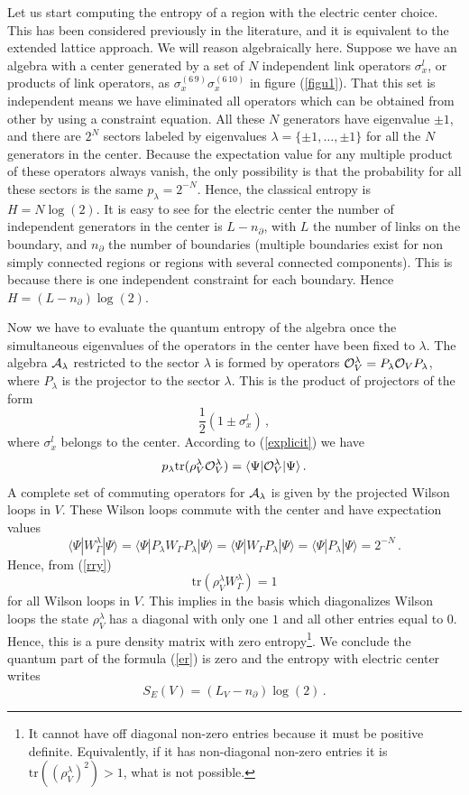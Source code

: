 \documentclass[12pt,a4paper]{article}
\newcommand{\be}{\begin{equation}}
\newcommand{\ee}{\end{equation}}
\def\be{\begin{equation}}
\def\ee{\end{equation}}
\begin{document}
Let us start computing the entropy of a region with the electric center choice. This has been considered previously in the literature, 
and it is equivalent to the extended lattice approach. We will reason algebraically here.  Suppose we have an algebra with a center 
generated by a set of $N$ independent link operators $\sigma_x^l$, or products of link operators, as $\sigma_x^{(6\, 9)} \sigma_x^{(6\, 10)}$ in 
figure (\ref{figu1}). That this set is independent means we have eliminated all operators which can be obtained from other by using a 
constraint equation. All these $N$ generators have eigenvalue $\pm 1$, and there are $2^N$ sectors labeled by 
eigenvalues $\lambda=\{\pm 1,\hdots,\pm 1\}$ for all the $N$ generators in the center. Because the expectation value for any 
multiple product of these operators always vanish, the only possibility is that the probability for all these sectors is the same $p_\lambda=2^{-N}$. 
Hence, the classical entropy is $H=N \log(2)$. It is easy to see for the electric center the number of independent generators in the 
center is $L-n_\partial$, with $L$ the number of links on the boundary, and $n_\partial$ the number of boundaries (multiple boundaries 
exist for non simply connected regions or regions with several connected components). This is because there is one independent constraint 
for each boundary. Hence $H=(L-n_\partial)\log(2)$.     

Now we have to evaluate the quantum entropy of the algebra once the simultaneous eigenvalues of the operators in the center have been 
fixed to $\lambda$. The algebra ${\cal A}_\lambda$ restricted to the sector $\lambda$ is formed by 
operators ${\cal O}_V^\lambda=P_\lambda {\cal O}_V P_\lambda$, where $P_\lambda$ is the projector to the sector $\lambda$. 
This is the product of projectors of the form
\be
\frac{1}{2}(1\pm \sigma_x^l)\,,
\ee  
where $\sigma_x^l$ belongs to the center.  
According to (\ref{explicit}) we have
\be
p_\lambda \textrm{tr}(\rho_V^\lambda {\cal O}_V^\lambda)=\langle \Psi|{\cal O}_V^\lambda|\Psi \rangle\,.\label{rry}
\ee
A complete set of commuting operators for ${\cal A}_\lambda$ is given by the projected Wilson loops in $V$. These Wilson loops 
commute with the center and have expectation values
\be
\langle \Psi|W_\Gamma^\lambda|\Psi \rangle=\langle \Psi|P_\lambda W_\Gamma P_\lambda|\Psi \rangle=\langle \Psi| W_\Gamma P_\lambda|\Psi \rangle=\langle \Psi|P_\lambda|\Psi \rangle=2^{-N}\,.
\ee 
Hence, from (\ref{rry}) 
\be
\textrm{tr}(\rho_V^\lambda W_\Gamma^\lambda)=1
\ee
for all Wilson loops in $V$. This implies in the basis which diagonalizes Wilson loops the state $\rho_V^\lambda$ 
has a diagonal with only one $1$ and all other entries equal to $0$. Hence, this is a pure density matrix with zero 
entropy\footnote{It cannot have off diagonal non-zero entries because it must be positive definite. Equivalently, if 
it has non-diagonal non-zero entries it is $\textrm{tr}((\rho_V^\lambda)^2)>1$, what is not possible.}. We conclude the 
quantum part of the formula (\ref{er}) is zero and the entropy with electric center writes
\be
S_E(V)=(L_V-n_\partial) \log (2)\,.\label{ele}
\ee 
\end{document}
